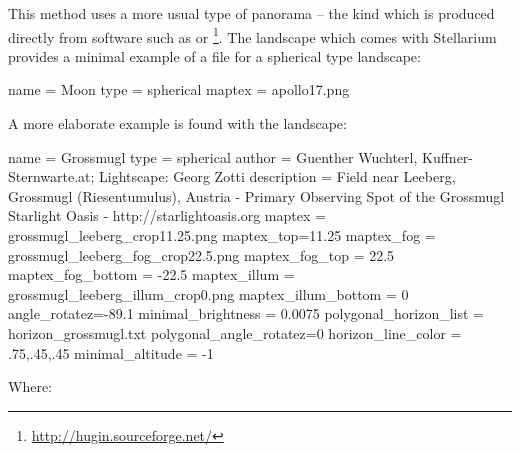 This method uses a more usual type of panorama -- the kind which is
produced directly from software such as  or
\footnote{\url{http://hugin.sourceforge.net/}}.  The
 landscape which comes with Stellarium provides a
minimal example of a  file for a spherical type
landscape:

\begin{configfile}
[landscape]
name = Moon
type = spherical
maptex = apollo17.png
\end{configfile}
A more elaborate example is found with the  landscape:

\begin{configfile}
[landscape]
name = Grossmugl
type = spherical
author = Guenther Wuchterl, Kuffner-Sternwarte.at;
         Lightscape: Georg Zotti
description = Field near Leeberg, Grossmugl (Riesentumulus),
              Austria - Primary Observing Spot of the Grossmugl
              Starlight Oasis - http://starlightoasis.org
maptex = grossmugl_leeberg_crop11.25.png
maptex_top=11.25
maptex_fog = grossmugl_leeberg_fog_crop22.5.png
maptex_fog_top = 22.5
maptex_fog_bottom = -22.5
maptex_illum = grossmugl_leeberg_illum_crop0.png
maptex_illum_bottom = 0
angle_rotatez=-89.1
minimal_brightness = 0.0075
polygonal_horizon_list = horizon_grossmugl.txt
polygonal_angle_rotatez=0
horizon_line_color =  .75,.45,.45
minimal_altitude = -1
\end{configfile}
Where:
